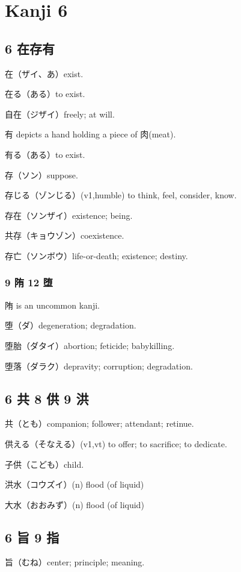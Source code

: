 \chapter{Kanji 6}

\section{6 在存有}

在（ザイ、あ）exist.

在る（ある）to exist.

自在（ジザイ）freely; at will.

有 depicts a hand holding a piece of 肉(meat).

有る（ある）to exist.

存（ソン）suppose.

存じる（ゾンじる）(v1,humble) to think, feel, consider, know.

存在（ソンザイ）existence; being.

共存（キョウゾン）coexistence.

存亡（ソンボウ）life-or-death; existence; destiny.

\subsection{9 陏 12 堕}

陏 is an uncommon kanji.

堕（ダ）degeneration; degradation.

堕胎（ダタイ）abortion; feticide; babykilling.

堕落（ダラク）depravity; corruption; degradation.

\section{6 共 8 供 9 洪}

共（とも）companion; follower; attendant; retinue.

供える（そなえる）(v1,vt) to offer; to sacrifice; to dedicate.

子供（こども）child.

洪水（コウズイ）(n) flood (of liquid)

大水（おおみず）(n) flood (of liquid)

\section{6 旨 9 指}

旨（むね）center; principle; meaning.

